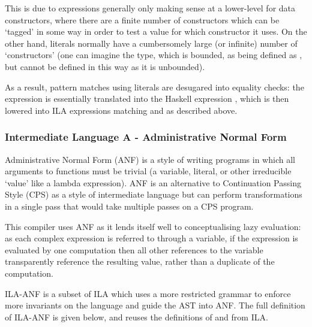 \documentclass[dissertation.tex]{subfiles}
\begin{document}
{{{{                This is due to  expressions generally only making sense at a lower-level for data
                constructors, where there are a finite number of constructors which can be `tagged' in some way in order
                to test a value for which constructor it uses. On the other hand, literals normally have a cumbersomely
                large (or infinite) number of `constructors' (one can imagine the  type, which is bounded,
                as being defined as , but  cannot be
                defined in this way as it is unbounded).
                
                As a result, pattern matches using literals are desugared into equality checks: the expression
                 is essentially translated into the Haskell expression
                , which is then lowered into ILA 
                expressions matching  and  as described above.

            }
        }
        \subsubsection{Intermediate Language A - Administrative Normal Form}
        {

            Administrative Normal Form (ANF) is a style of writing programs in which all arguments to functions must be
            trivial (a variable, literal, or other irreducible `value' like a lambda expression). ANF is an alternative
            to Continuation Passing Style (CPS) as a style of intermediate language but can perform transformations in a
            single pass that would take multiple passes on a CPS program\cite{ANF}.

            This compiler uses ANF as it lends itself well to conceptualising lazy evaluation: as each complex
            expression is referred to through a variable, if the expression is evaluated by one computation then all
            other references to the variable transparently reference the resulting value, rather than a duplicate of the
            computation.

            ILA-ANF is a subset of ILA which uses a more restricted grammar to enforce more invariants on the language
            and guide the AST into ANF. The full definition of ILA-ANF is given below, and reuses the definitions of
             and  from ILA.

}}}
\end{document}
